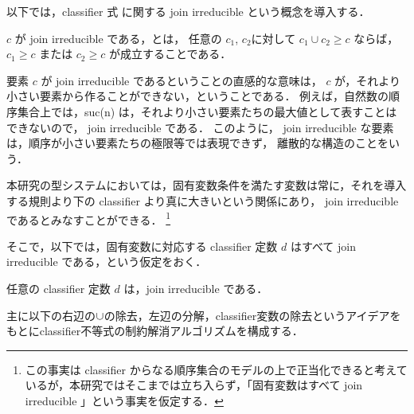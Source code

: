 以下では，classifier 式 に関する join irreducible という概念を導入する．
\begin{defi}
  \label{theo:join-ir}
  $c$ が join irreducible である，とは，
  任意の $c_1$, $c_2$に対して $c_1 \cup c_2 \ge c$ ならば，
  $c_1 \ge c$ または $c_2 \ge c$ が成立することである．
\end{defi}

要素 $c$ が join irreducible であるということの直感的な意味は，
$c$ が，それより小さい要素から作ることができない，ということである．
例えば，自然数の順序集合上では，suc(n) は，それより小さい要素たちの最大値として表すことはできないので， join irreducible である．
このように， join irreducible な要素は，順序が小さい要素たちの極限等では表現できず，
離散的な構造のことをいう．

本研究の型システムにおいては，固有変数条件を満たす変数は常に，それを導入する規則より下の classifier より真に大きいという関係にあり， join irreducible であるとみなすことができる．
\footnote{この事実は classifier からなる順序集合のモデルの上で正当化できると考えているが，本研究ではそこまでは立ち入らず，「固有変数はすべて join irreducible 」という事実を仮定する．}

そこで，以下では，固有変数に対応する classifier 定数 $d$ はすべて join irreducible である，という仮定をおく．

\begin{supp}
  \label{supp:d-is-join-ir}
  任意の classifier 定数 $d$ は，join irreducible である．
\end{supp}


主に以下の右辺の$\cup$の除去，左辺の分解，classifier変数の除去というアイデアをもとにclassifier不等式の制約解消アルゴリズムを構成する．

